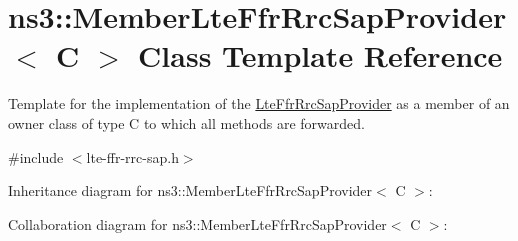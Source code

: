\hypertarget{classns3_1_1MemberLteFfrRrcSapProvider}{}\section{ns3\+:\+:Member\+Lte\+Ffr\+Rrc\+Sap\+Provider$<$ C $>$ Class Template Reference}
\label{classns3_1_1MemberLteFfrRrcSapProvider}


Template for the implementation of the \hyperlink{classns3_1_1LteFfrRrcSapProvider}{Lte\+Ffr\+Rrc\+Sap\+Provider} as a member of an owner class of type C to which all methods are forwarded.  




{\ttfamily \#include $<$lte-\/ffr-\/rrc-\/sap.\+h$>$}



Inheritance diagram for ns3\+:\+:Member\+Lte\+Ffr\+Rrc\+Sap\+Provider$<$ C $>$\+:


Collaboration diagram for ns3\+:\+:Member\+Lte\+Ffr\+Rrc\+Sap\+Provider$<$ C $>$\+:
